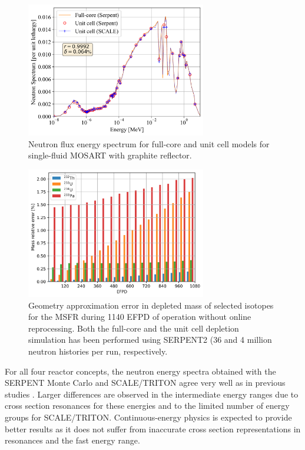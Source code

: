 \documentclass[letterpaper]{mandc2019}
\begin{document}
\begin{figure}[!htb]
  \centering
  \includegraphics[width=0.7\textwidth]{./Figures/mosart_full_vs_unit_spectrum.png}
  \caption{Neutron flux energy spectrum for full-core and unit cell models for single-fluid \gls{MOSART} with graphite reflector.}
  \label{fig:spectrum_mosart}
\end{figure}
\begin{figure}[!htb]
  \centering
  \includegraphics[width=0.7\textwidth]{./Figures/msfr_depl_f_vs_u.png}
  \caption{Geometry approximation error in depleted mass of selected isotopes for the \gls{MSFR} during 1140 EFPD of operation without online reprocessing. Both the full-core and the unit cell depletion simulation has been performed using SERPENT2 (36 and 4 million neutron histories per run, respectively.}
  \label{fig:msfr_depl_err}
\end{figure}
For all four reactor concepts, the neutron energy spectra obtained with the SERPENT Monte Carlo and SCALE/TRITON agree very well as in previous studies \cite{betzler_fuel_2018}. Larger differences are observed in the intermediate energy ranges due to cross section resonances for these energies and to the limited number of energy groups for SCALE/TRITON. Continuous-energy physics is expected to provide better results as it does not suffer from inaccurate cross section representations in resonances and the fast energy range. 
\end{document}
